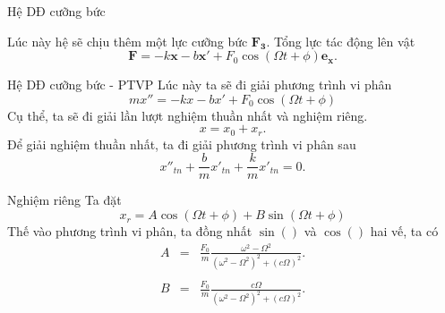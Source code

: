 \begin{frame}{Hệ DĐ cưỡng bức}
    \begin{center}
        \resizebox{0.7\linewidth}{!}{}
    \end{center}
    Lúc này hệ sẽ chịu thêm một lực cưỡng bức \(\mathbf{F_3}\). Tổng lực tác động lên vật
    \begin{equation}
        \displaystyle \mathbf{F} =  - k \mathbf{x} - b \mathbf{x'} + F_0 \cos{(\Omega t + \phi)} \mathbf{e_x}.
    \end{equation}
\end{frame}
\begin{frame}{Hệ DĐ cưỡng bức - PTVP}
    Lúc này ta sẽ đi giải phương trình vi phân
    \begin{equation}
        mx'' = -kx -bx' + F_0 \cos{(\Omega t + \phi)}
    \end{equation}
    Cụ thể, ta sẽ đi giải lần lượt nghiệm thuần nhất và nghiệm riêng.
    \begin{equation*}
        x = x_{0} + x_r.
    \end{equation*}
    Để giải nghiệm thuần nhất, ta đi giải phương trình vi phân sau
    \begin{equation*}
    x''_{tn} + {\displaystyle \frac{b}{m}} x'_{tn} + {\displaystyle \frac{k}{m}} x'_{tn} = 0.
    \end{equation*}
\end{frame}
\begin{frame}{Nghiệm riêng}
    Ta đặt
    \begin{equation*}
        x_r = A \cos{\left(\Omega t + \phi\right)} + B \sin{\left(\Omega t + \phi\right)}
    \end{equation*}
    Thế vào phương trình vi phân, ta đồng nhất \(\sin{()}\) và \(\cos{()}\) hai vế, ta có
    \begin{equation}
        \begin{array}{ccc}
        A &=& \displaystyle \frac{F_0}{m} \frac{\omega^2 - \Omega^2}{\left(\omega^2 - \Omega^2 \right)^2 + \left( c \Omega \right)^2}. 
        \\
        \\
        B &=& \displaystyle \frac{F_0}{m} \frac{c \Omega}{\left(\omega^2 - \Omega^2 \right)^2 + \left( c \Omega \right)^2}.
        \end{array}
    \end{equation}
\end{frame}